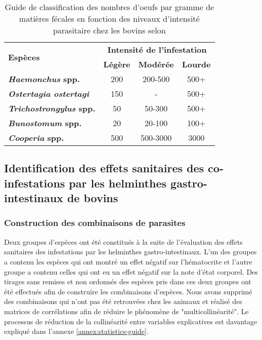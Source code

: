 \begin{table}[!h]
	\centering
	\caption[Guide de classification des nombres d'oeufs par gramme de matières fécales 
	en fonction des niveaux d'intensité parasitaire]{Guide de classification des nombres 
	d'oeufs par gramme de matières fécales en fonction des niveaux d'intensité parasitaire 
	chez les bovins selon }
	\label{tab:guide-magnitude-infestation} 
	\begin{tabular}[t]{lccc}
		\toprule
		\multirow{2}{3cm}{\bf Espèces} & \multicolumn{3}{c}{\bf Intensité de l'infestation} \\
		\cline{2-4}
		& \textbf{Légère }& \textbf{Modérée} & \textbf{Lourde} \\
		\midrule
		\textbf{\textit{Haemonchus} spp.} & 200 & 200-500 & 500+ \\
		\midrule
		\textit{\textbf{Ostertagia ostertagi}} & 150 & - & 500+ \\
		\midrule
		\textbf{\textit{Trichostrongylus} spp.} & 50 & 50-300 & 500+ \\
		\midrule
		\textbf{\textit{Bunostomum} spp.} & 20 & 20-100 & 100+ \\
		\midrule
		\textbf{\textit{Cooperia} spp.} & 500 & 500-3000 & 3000 \\
		\midrule
	\end{tabular}
\end{table}

\subsection{Identification des effets sanitaires des co-infestations par les helminthes 
gastro-intestinaux de bovins}
\subsubsection{Construction des combinaisons de parasites}
Deux groupes d'espèces ont été constitués à la suite de l'évaluation des effets sanitaires
des infestations par les helminthes gastro-intestinaux. L'un des groupes a contenu les espèces
qui ont montré un effet négatif sur l'hématocrite et l'autre groupe a contenu celles qui ont eu
un effet négatif sur la note d'état corporel.
Des tirages sans remises et non ordonnés des espèces pris dans ces deux groupes ont été 
effectués afin de construire les combinaisons d'espèces. Nous avons supprimé 
des combinaisons qui n'ont pas été retrouvées chez les animaux et réalisé des 
matrices de corrélations afin de réduire le phénomène de "multicollinéarité". Le processus de réduction de la collinéarité entre variables explicatives est davantage expliqué dans l'annexe \ref{annex:statistics-guide}.

